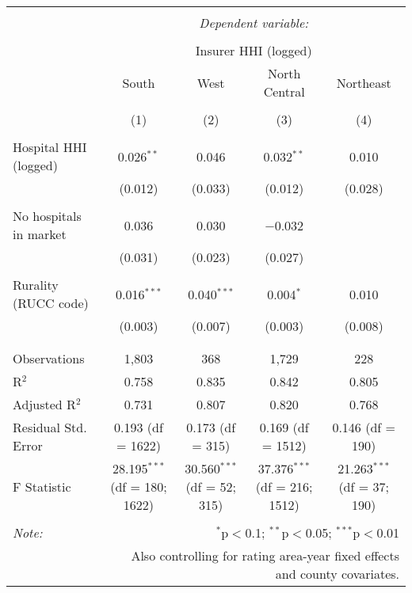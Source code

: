 
\begingroup 
\scriptsize 
\begin{tabular}{@{\extracolsep{5pt}}lcccc} 
\\[-1.8ex]\hline 
\hline \\[-1.8ex] 
 & \multicolumn{4}{c}{\textit{Dependent variable:}} \\ 
\cline{2-5} 
\\[-1.8ex] & \multicolumn{4}{c}{Insurer HHI (logged)} \\ 
 & South & West & North Central & Northeast \\ 
\\[-1.8ex] & (1) & (2) & (3) & (4)\\ 
\hline \\[-1.8ex] 
 Hospital HHI (logged) & 0.026$^{**}$ & 0.046 & 0.032$^{**}$ & 0.010 \\ 
  & (0.012) & (0.033) & (0.012) & (0.028) \\ 
  & & & & \\ 
 No hospitals in market & 0.036 & 0.030 & $-$0.032 &  \\ 
  & (0.031) & (0.023) & (0.027) &  \\ 
  & & & & \\ 
 Rurality (RUCC code) & 0.016$^{***}$ & 0.040$^{***}$ & 0.004$^{*}$ & 0.010 \\ 
  & (0.003) & (0.007) & (0.003) & (0.008) \\ 
  & & & & \\ 
\hline \\[-1.8ex] 
Observations & 1,803 & 368 & 1,729 & 228 \\ 
R$^{2}$ & 0.758 & 0.835 & 0.842 & 0.805 \\ 
Adjusted R$^{2}$ & 0.731 & 0.807 & 0.820 & 0.768 \\ 
Residual Std. Error & 0.193 (df = 1622) & 0.173 (df = 315) & 0.169 (df = 1512) & 0.146 (df = 190) \\ 
F Statistic & 28.195$^{***}$ (df = 180; 1622) & 30.560$^{***}$ (df = 52; 315) & 37.376$^{***}$ (df = 216; 1512) & 21.263$^{***}$ (df = 37; 190) \\ 
\hline 
\hline \\[-1.8ex] 
\textit{Note:}  & \multicolumn{4}{r}{$^{*}$p$<$0.1; $^{**}$p$<$0.05; $^{***}$p$<$0.01} \\ 
 & \multicolumn{4}{r}{Also controlling for rating area-year fixed effects and county covariates.} \\ 
\end{tabular} 
\endgroup 
